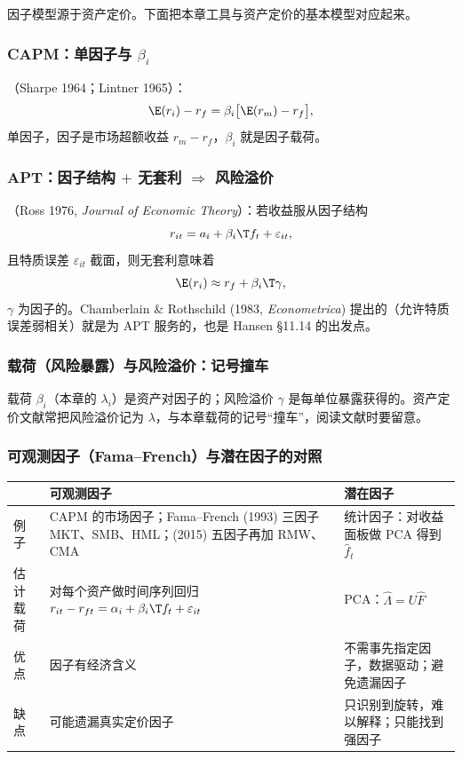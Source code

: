 因子模型源于资产定价。下面把本章工具与资产定价的基本模型对应起来。

\subsubsection{CAPM：单因子与 \texorpdfstring{$\beta_i$}{beta\_i}}

（Sharpe 1964；Lintner 1965）：
\[
\E(r_i)-r_f=\beta_i\bigl[\E(r_m)-r_f\bigr],
\]
单因子，因子是市场超额收益 $r_m-r_f$，$\beta_i$ 就是因子载荷。

\subsubsection{APT：因子结构 \texorpdfstring{$+$}{+} 无套利 \texorpdfstring{$\Rightarrow$}{=>} 风险溢价}

（Ross 1976, \emph{Journal of Economic Theory}）：若收益服从因子结构
\[
r_{it}=a_i+\beta_i\T f_t+\varepsilon_{it},
\]
且特质误差 $\varepsilon_{it}$ 截面，则无套利意味着
\[
\E(r_i)\approx r_f+\beta_i\T\gamma ,
\]
$\gamma$ 为因子的。Chamberlain \& Rothschild (1983, \emph{Econometrica}) 提出的（允许特质误差弱相关）就是为 APT 服务的，也是 Hansen §11.14 的出发点。

\subsubsection{载荷（风险暴露）与风险溢价：记号撞车}

\begin{note}[载荷 $\ne$ 风险溢价]
载荷 $\beta_i$（本章的 $\lambda_i$）是资产对因子的；风险溢价 $\gamma$ 是每单位暴露获得的。资产定价文献常把风险溢价记为 $\lambda$，与本章载荷的记号“撞车”，阅读文献时要留意。
\end{note}

\subsubsection{可观测因子（Fama--French）与潜在因子的对照}

\begin{center}
\small
\begin{tabularx}{\linewidth}{lLL}
\toprule
 & 可观测因子 & 潜在因子\\
\midrule
例子 & CAPM 的市场因子；Fama--French (1993) 三因子 MKT、SMB、HML；(2015) 五因子再加 RMW、CMA & 统计因子：对收益面板做 PCA 得到 $\hat f_t$\\
估计载荷 & 对每个资产做时间序列回归 $r_{it}-r_{ft}=\alpha_i+\beta_i\T f_t+\varepsilon_{it}$ & PCA：$\hat\Lambda=U\hat F$\\
优点 & 因子有经济含义 & 不需事先指定因子，数据驱动；避免遗漏因子\\
缺点 & 可能遗漏真实定价因子 & 只识别到旋转，难以解释；只能找到强因子\\
\bottomrule
\end{tabularx}
\end{center}

